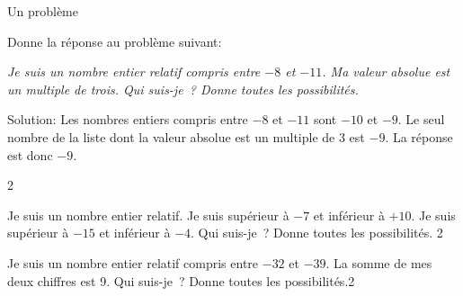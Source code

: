 \documentclass[a4paper,11pt]{report}
\begin{document}
\begin{resolu}{Un problème}{Donne la réponse au problème suivant:
\begin{center}
	{\itshape
	Je suis un nombre entier relatif compris entre $-8$ et $-11$. Ma valeur absolue est un multiple de trois. Qui suis-je~?  Donne toutes les possibilités.}
\end{center}

Solution: Les nombres entiers compris entre $-8$ et $-11$ sont $-10$ et $-9$. Le seul nombre de la liste dont la valeur absolue est un multiple de 3 est $-9$. La réponse est donc $-9$.}
{2}
\end{resolu}

\begin{exo}
 {Je suis un nombre entier relatif. Je suis supérieur à $-7$ et inférieur à $+10$. Je suis supérieur à $-15$ et inférieur à $-4$. Qui suis-je~? Donne toutes les possibilités.}
 {2}
\end{exo}
\begin{exo}
 {Je suis un nombre entier relatif compris entre $-32$ et $-39$. La somme de mes deux chiffres est 9. Qui suis-je~? Donne toutes les possibilités.}{2}
\end{exo}
\end{document}
